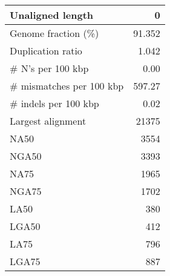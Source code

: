 \documentclass[12pt,a4paper]{article}
\begin{document}
\begin{table}[ht]
\begin{center}
\begin{tabular}{|l*{1}{|r}|}
Unaligned length & 0 \\ \hline
Genome fraction (\%) & 91.352 \\ \hline
Duplication ratio & 1.042 \\ \hline
\# N's per 100 kbp & 0.00 \\ \hline
\# mismatches per 100 kbp & 597.27 \\ \hline
\# indels per 100 kbp & 0.02 \\ \hline
Largest alignment & 21375 \\ \hline
NA50 & 3554 \\ \hline
NGA50 & 3393 \\ \hline
NA75 & 1965 \\ \hline
NGA75 & 1702 \\ \hline
LA50 & 380 \\ \hline
LGA50 & 412 \\ \hline
LA75 & 796 \\ \hline
LGA75 & 887 \\ \hline
\end{tabular}
\end{center}
\end{table}
\end{document}
